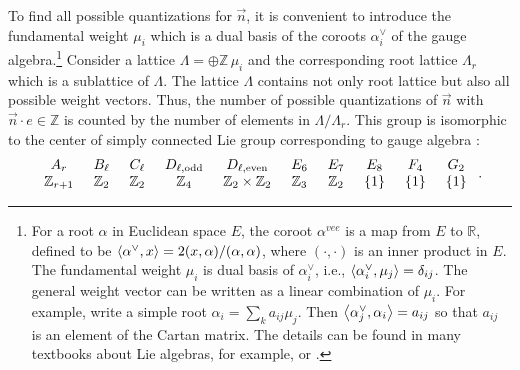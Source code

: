 To find all possible quantizations for $\vec{n}$, it is convenient to introduce the fundamental weight $\mu_i$ which is a dual basis of the coroots $ \alpha_i^\vee $ of the gauge algebra.\footnote{For a root $ \alpha $ in Euclidean space $ E $, the coroot $\alpha^{vee}$ is a map from $ E $ to $ \mathbb{R} $, defined to be $ \left\langle {\alpha^\vee}, {x} \right\rangle = 2(x, \alpha)/(\alpha, \alpha) $, where $ (\cdot, \cdot) $ is an inner product in $ E $. The fundamental weight $ \mu_i $ is dual basis of $ \alpha_i^\vee $, i.e., $ \left\langle {\alpha_i^\vee}, {\mu_j} \right\rangle = \delta_{ij} $. The general weight vector can be written as a linear combination of $ \mu_i $. For example, write a simple root $ \alpha_i = \sum_k a_{ij} \mu_j$. Then $ \left\langle {\alpha_j^\vee}, {\alpha_i} \right\rangle = a_{ij} $ so that $ a_{ij} $ is an element of the Cartan matrix. The details can be found in many textbooks about Lie algebras, for example, \cite{humphreys_introduction_1972} or \cite{bump_lie_2013}.} Consider a lattice $ \Lambda = \oplus \mathbb{Z}\, \mu_i $ and the corresponding root lattice $ \Lambda_r $ which is a sublattice of $ \Lambda $. The lattice $ \Lambda $ contains not only root lattice but also all possible weight vectors. Thus, the number of possible quantizations of $ \vec{n} $ with $ \vec{n} \cdot e \in \mathbb{Z} $ is counted by the number of elements in $ \Lambda / \Lambda_r $. This group is isomorphic to the center of simply connected Lie group corresponding to gauge algebra \cite{humphreys_introduction_1972, bump_lie_2013}:
\begin{align}
\begin{array}{cccccccccc}
A_r & \hspace{1ex} B_\ell & \hspace{1ex} C_\ell & \hspace{1ex} D_{\ell, \text{odd}} & \hspace{1ex} D_{\ell,\text{even}} & \hspace{1ex} E_6 & \hspace{1ex} E_7 & \hspace{1ex} E_8 & \hspace{1ex} F_4 & \hspace{1ex} G_2 \\
\mathbb{Z}_{r + 1} & \hspace{1ex} \mathbb{Z}_2 & \hspace{1ex} \mathbb{Z}_2& \hspace{1ex} \mathbb{Z}_4  & \hspace{1ex} \mathbb{Z}_2 \times \mathbb{Z}_2 & \hspace{1ex} \mathbb{Z}_3 & \hspace{1ex} \mathbb{Z}_2 & \hspace{1ex} \{1\} & \hspace{1ex} \{1\} & \hspace{1ex} \{1\}
\end{array} \ .
\end{align}

